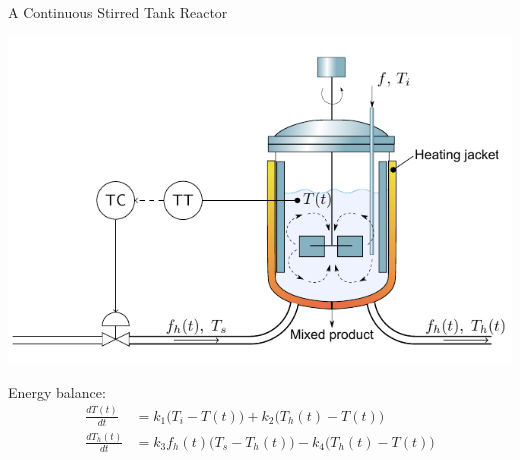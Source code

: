 \documentclass[presentation,aspectratio=169]{beamer}
\begin{document}
\begin{frame}[label={sec:org5610c92}]{A Continuous Stirred Tank Reactor}
\begin{center}
\includegraphics[height=0.4\textheight]{../../figures/stirred_tank_heat_exchange}
\end{center}

Energy balance:
\begin{align*}
\frac{dT(t)}{dt} &= k_1\big( T_i - T(t) \big) + k_2 \big( T_h(t) - T(t)\big)\\
\frac{dT_h(t)}{dt} &= k_3f_h(t)\big( T_s - T_h(t) \big) - k_4 \big( T_h(t) - T(t)\big)
\end{align*}
\end{frame}
\end{document}
